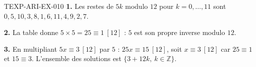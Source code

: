 \begin{corrige}{TEXP-ARI-EX-010}
\textbf{1.} Les restes de $5k$ modulo $12$ pour $k=0,\dots,11$ sont
$0,5,10,3,8,1,6,11,4,9,2,7$.

\textbf{2.} La table donne $5\times5=25\equiv1\ [12]$ : $5$ est son propre
inverse modulo $12$.

\textbf{3.} En multipliant $5x\equiv3\ [12]$ par $5$ : $25x\equiv15\ [12]$,
soit $x\equiv3\ [12]$ car $25\equiv1$ et $15\equiv3$. L'ensemble des solutions
est $\{3+12k,\ k\in\mathbb{Z}\}$.
\end{corrige}
